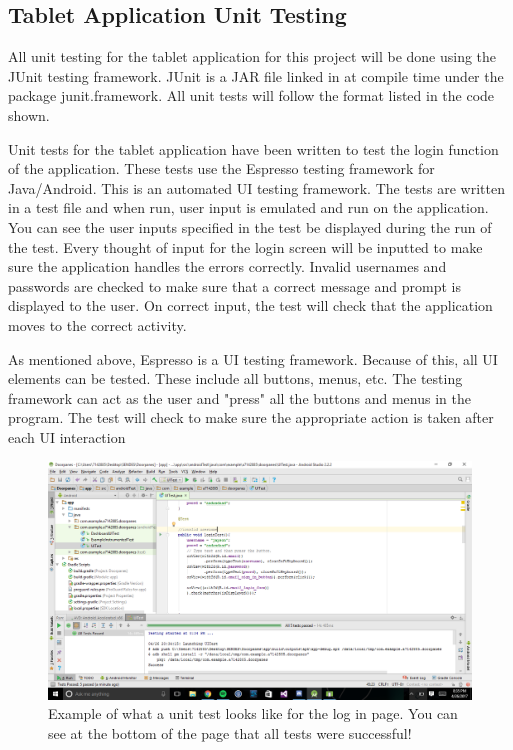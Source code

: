 \subsection{Tablet Application Unit Testing}
All unit testing for the tablet application for this project will be done using the JUnit testing framework.  JUnit is a JAR file linked in at compile time under the package junit.framework. All unit tests will follow the format listed in the code shown.


Unit tests for the tablet application have been written to test the login function of the application.  These tests use the Espresso testing framework for Java/Android. This is an automated UI testing framework.  The tests are written in a test file and when run, user input is emulated and run on the application.  You can see the user inputs specified in the test be displayed during the run of the test.  Every thought of input for the login screen will be inputted to make sure the application handles the errors correctly.  Invalid usernames and passwords are checked to make sure that a correct message and prompt is displayed to the user.  On correct input, the test will check that the application moves to the correct activity.

As mentioned above, Espresso is a UI testing framework.  Because of this, all UI elements can be tested.  These include all buttons, menus, etc.  The testing framework can act as the user and "press" all the buttons and menus in the program.  The test will check to make sure the appropriate action is taken after each UI interaction	

\begin{figure}
  \includegraphics[width=\linewidth]{tablettest.png}
  \caption{Example of what a unit test looks like for the log in page.  You can see at the bottom of the page that all tests were successful!}
  \label{fig:tablettesting}
\end{figure} 

